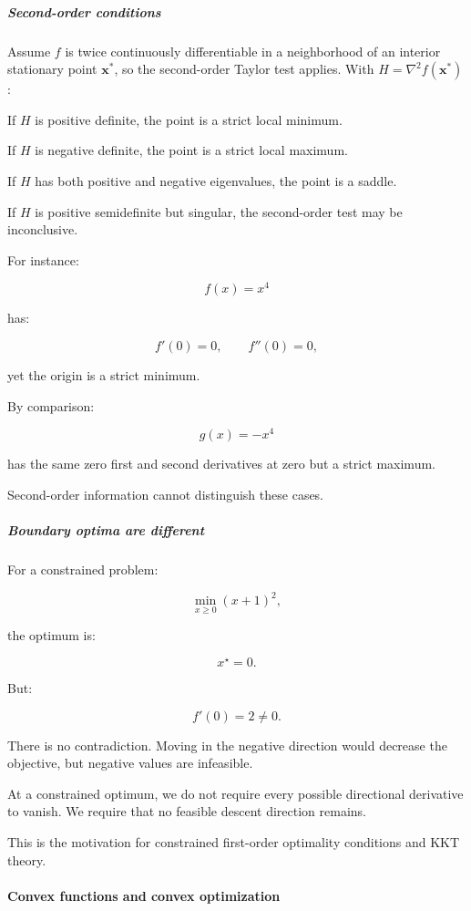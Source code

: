 \subparagraph{Second-order conditions}\label{second-order-conditions}

Assume \(f\) is twice continuously differentiable in a neighborhood of an interior stationary point \(\mathbf x^*\), so the second-order Taylor test applies. With \(H=\nabla^2 f(\mathbf x^*)\):

If \(H\) is positive definite, the point is a strict local minimum.

If \(H\) is negative definite, the point is a strict local maximum.

If \(H\) has both positive and negative eigenvalues, the point is a saddle.

If \(H\) is positive semidefinite but singular, the second-order test may be inconclusive.

For instance:

\[
f(x)=x^4
\]

has:

\[
f'(0)=0,\qquad f''(0)=0,
\]

yet the origin is a strict minimum.

By comparison:

\[
g(x)=-x^4
\]

has the same zero first and second derivatives at zero but a strict maximum.

Second-order information cannot distinguish these cases.

\subparagraph{Boundary optima are different}\label{boundary-optima-are-different}

For a constrained problem:

\[
\min_{x\ge0}(x+1)^2,
\]

the optimum is:

\[
x^\star=0.
\]

But:

\[
f'(0)=2\ne0.
\]

There is no contradiction. Moving in the negative direction would decrease the objective, but negative values are infeasible.

At a constrained optimum, we do not require every possible directional derivative to vanish. We require that no feasible descent direction remains.

This is the motivation for constrained first-order optimality conditions and KKT theory.

\paragraph{Convex functions and convex optimization}\label{convex-functions-and-convex-optimization}

